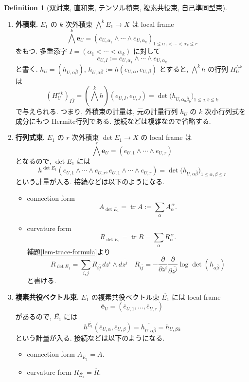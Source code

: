 \documentclass[dvipdfmx,a4paper,11pt]{article} %
\theoremstyle{definition}
\newtheorem{defn}[thm]{Definition}
\theoremstyle{remark}
\numberwithin{equation}{section}
\newcommand{\End}[0]{\operatorname{End}}
\newcommand{\xr}[1]{\textcolor{red}{#1}}
\begin{document}
\begin{defn}[双対束, 直和束, テンソル積束, 複素共役束, 自己準同型束]
\begin{enumerate}
\item \textbf{外積束.} 
\(E_1\) の \(k\) 次外積束 \(\bigwedge^k E_1\to X\) は local frame
\[
\bigwedge^k\mathbf{e}_U
=
(e_{U,\alpha_1}\wedge\cdots\wedge e_{U,\alpha_k})_{1\leq \alpha_1<\cdots<\alpha_k\leq r}
\]
をもつ. 多重添字 \(I=(\alpha_1<\cdots<\alpha_k)\) に対して
\[
e_{U,I}:=e_{U,\alpha_1}\wedge\cdots\wedge e_{U,\alpha_k}
\]
と書く. \(h_U=(h_{U,\alpha\overline{\beta}})\), \(h_{U,\alpha\overline{\beta}}:=h(e_{U,\alpha},e_{U,\beta})\) とすると, \(\bigwedge^k h\) の行列 \(H_{U}^{\wedge k}\) は
\[
(H_{U}^{\wedge k})_{I\overline J}
=
(\bigwedge^k h)(e_{U,I},e_{U,J})
=
\det\bigl(h_{U,\alpha_a\overline{\beta}_b}\bigr)_{1\leq a,b\leq k}
\]
で与えられる. つまり, 外積束の計量は, 元の計量行列 \(h_U\) の \(k\) 次小行列式を成分にもつ Hermite行列である. 接続などは複雑なので省略する.

\item
 \textbf{行列式束.} \(E_1\) の \(r\) 次外積束 \(\det E_1\to X\) の local frame は
\[
\bigwedge^r \mathbf{e}_U=
(e_{U, 1}\wedge\cdots\wedge e_{U, r})
\]
となるので, \(\det E_1\) には
\[
h^{\det E_1}(e_{U, 1}\wedge\cdots\wedge e_{U, r}, e_{U, 1}\wedge\cdots\wedge e_{U, r})
= \det\bigl(h_{U,\alpha\overline{\beta}}\bigr)_{1\leq \alpha,\beta\leq r}
\]
という計量が入る. 接続などは以下のようになる.
\begin{itemize}
\item connection form
\[
A_{\det E_1}=\operatorname{tr}A:=\sum_\alpha A_\alpha^{\,\alpha}.
\]
\item curvature form
\[
R_{\det E_1} = \operatorname{tr}R=\sum_\alpha R_\alpha^{\,\alpha}.
\]
補題\ref{lem-trace-formula}より
\[
R_{\det E_1}=\sum_{i,j}R_{i\overline j}\,dz^i\wedge d\overline{z^j}
\quad
R_{i\overline j}=-
\frac{\partial}{\partial z^i} 
\frac{\partial }{\partial \overline{z^j}}
\log\det(h_{\alpha\overline{\beta}})
\]
と書ける. 
\end{itemize}

\item  \textbf{複素共役ベクトル束.} 
 \(E_1\) の複素共役ベクトル束 \(\overline{E_1}\) には local frame
 \[
\overline{\mathbf{e}}_U=(\overline{e}_{U,1},\ldots,\overline{e}_{U,r})
\]
があるので, \(\overline{E_1}\) には
\[
h^{\overline{E_1}}(\overline{e}_{U,\alpha}, \overline{e}_{U,\beta})
=\overline{h_{U,\alpha\overline{\beta}}}=h_{U,\beta\overline{\alpha}}
\]
という計量が入る. 接続などは以下のようになる.
\begin{itemize}
\item connection form
\(
A_{\overline{E_1}}=\overline{A}.
\)
\item curvature form
\(
R_{\overline{E_1}}=\overline{R}.
\)
\end{itemize}


\end{enumerate}
\end{defn}
\end{document}
